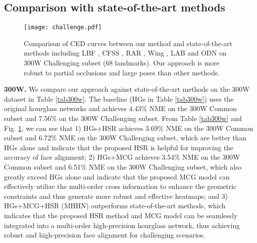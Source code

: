 \documentclass[journal]{IEEEtran}
\begin{document}
\subsection{Comparison with state-of-the-art methods}
\begin{figure}[t]
	\begin{center}
		\texttt{[image: challenge.pdf]}
	\end{center}
	\caption{Comparison of CED curves between our method and state-of-the-art methods including LBF \cite{ren2014face}, CFSS \cite{zhu2015face}, RAR \cite{Xiao2016Robust}, Wing \cite{Feng2017WingLF}, LAB \cite{Wu2018LookAB} and ODN \cite{Zhu2019RobustFL} on 300W Challenging subset (68 landmarks). Our approach is more robust to partial occlusions and large poses than other methods.}
	\label{figchall}
\end{figure}
\textbf{300W.} We compare our approach against state-of-the-art methods on the 300W dataset in Table \ref{tab300w}. The baseline (HGs \cite{Yang2017StackedHN} in Table \ref{tab300w}) uses the original hourglass networks and achieves 4.43\% NME on the 300W Common subset and 7.56\% on the 300W Challenging subset. From Table \ref{tab300w} and Fig. \ref{figchall}, we can see that 1) HGs+HSR achieves 3.69\% NME on the 300W Common subset and 6.72\% NME on the 300W Challenging subset, which are better than HGs alone and indicate that the proposed HSR is helpful for improving the accuracy of face alignment; 2) HGs+MCG achieves 3.54\% NME on the 300W Common subset and 6.51\% NME on the 300W Challenging subset, which also greatly exceed HGs alone and indicate that the proposed MCG model can effectively utilize the multi-order cross information to enhance the geometric constraints and thus generate more robust and effective heatmaps; and 3) HGs+MCG+HSR (MHHN) outperforms state-of-the-art methods, which indicates that the proposed HSR method and MCG model can be seamlessly integrated into a multi-order high-precision hourglass network, thus achieving robust and high-precision face alignment for challenging scenarios.
\end{document}

